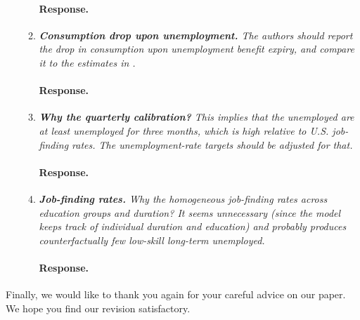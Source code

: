 \documentclass[12pt,letterpaper,english]{article}
\begin{document}
\begin{enumerate}
\begin{enumerate}
		\paragraph{Response.} 

		\item \textit{\textbf{Consumption drop upon unemployment.} The authors should report the drop in consumption upon unemployment benefit expiry, and compare it 	to the estimates in \citet{ganongConsumer2019}.}

		\paragraph{Response.} 
		
		\item \textit{\textbf{Why the quarterly calibration?} This implies that the unemployed are at least unemployed for three months, which is high relative to U.S. job-finding rates. The unemployment-rate targets should be adjusted for that.}

		\paragraph{Response.} 
		
		\item \textit{\textbf{Job-finding rates.} Why the homogeneous job-finding rates across education groups and duration? It seems unnecessary (since the model keeps track of individual duration and education) and probably produces counterfactually few low-skill long-term unemployed.}
		
		\paragraph{Response.} 
		
		
	\end{enumerate}
\end{enumerate}

\bigskip

\noindent Finally, we would like to thank you again for your careful advice on our paper. We hope you find our revision satisfactory.



\end{document}
